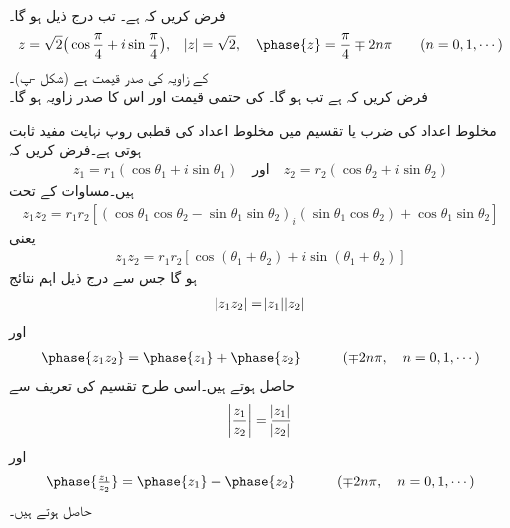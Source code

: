 \quad {}\\
فرض کریں کہ  ہے۔ تب درج ذیل ہو گا۔
\begin{align*}
z=\sqrt{2}\big(\cos \frac{\pi}{4}+i\sin\frac{\pi}{4}\big), \quad \abs{z}=\sqrt{2},\quad \phase{z}=\frac{\pi}{4}\mp2n\pi \quad \quad (n=0,1,\cdots)
\end{align*}
 کے زاویہ کی صدر قیمت  ہے (شکل -پ)۔
\quad {}\\
فرض کریں کہ  ہے تب  ہو گا۔ کی حتمی قیمت  اور اس کا صدر زاویہ  ہو گا۔

مخلوط اعداد کی  ضرب یا تقسیم میں مخلوط اعداد کی قطبی روپ نہایت مفید ثابت ہوتی ہے۔فرض کریں کہ
\begin{align*}
z_1=r_1(\cos\theta_1+i\sin\theta_1)\quad \text{اور}\quad z_2=r_2(\cos \theta_2+i\sin\theta_2)
\end{align*} 
ہیں۔مساوات  کے تحت 
\begin{align*}
z_1z_2=r_1r_2[(\cos\theta_1\cos\theta_2-\sin\theta_1\sin\theta_2)_i(\sin\theta_1\cos\theta_2)+\cos\theta_1\sin\theta_2]
\end{align*}
یعنی
\begin{align}\label{مساوات_مخلوط_ضرب_نتائج_الف}
z_1z_2=r_1r_2[\cos(\theta_1+\theta_2)+i\sin(\theta_1+\theta_2)]
\end{align}
ہو گا جس سے درج ذیل اہم نتائج
\begin{align}\label{مساوات_مخلوط_ضرب_نتائج_ب}
\abs{z_1z_2}=\abs{z_1}\abs{z_2}
\end{align}
اور
\begin{align}\label{مساوات_مخلوط_ضرب_نتائج_پ}
\phase{z_1z_2}=\phase{z_1}+\phase{z_2}\quad \quad\quad (\mp 2n\pi, \quad n=0,1,\cdots)
\end{align}
حاصل ہوتے ہیں۔اسی طرح تقسیم کی تعریف سے 
\begin{align}\label{مساوات_مخلوط_تقسیم_نتائج_الف}
\abs{\frac{z_1}{z_2}}=\frac{\abs{z_1}}{\abs{z_2}}
\end{align}
اور
\begin{align}\label{مساوات_مخلوط_تقسیم_نتائج_ب}
\phase{\tfrac{z_1}{z_2}}=\phase{z_1}-\phase{z_2} \quad \quad\quad (\mp 2n\pi, \quad n=0,1,\cdots)
\end{align}
حاصل ہوتے ہیں۔

